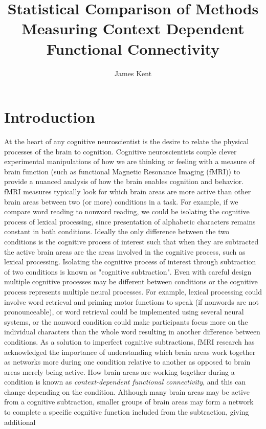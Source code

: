 \documentclass[phd,appendix,figures]{uithesis}
\title{Statistical Comparison of Methods Measuring Context Dependent Functional Connectivity}
\author{James Kent}
\begin{document}
\frontmatter
\chapter{Introduction}

At the heart of any cognitive neuroscientist is the desire to relate the physical
processes of the brain to cognition.
Cognitive neuroscientists couple clever experimental manipulations
of how we are thinking or feeling with a measure of brain function
(such as functional Magnetic Resonance Imaging (fMRI)) to provide a nuanced
analysis of how the brain enables cognition and behavior.
fMRI measures typically look for which brain areas are more
active than other brain areas between two (or more) conditions in a task.
For example, if we compare word reading to nonword reading, we could be isolating
the cognitive process of lexical processing, since presentation of alphabetic characters
remains constant in both conditions.
Ideally the only difference between the two conditions is the cognitive process
of interest such that when they are subtracted the active brain areas are
the areas involved in the cognitive process, such as lexical processing.
Isolating the cognitive process of interest through subtraction of two conditions
is known as "cognitive subtraction".
Even with careful design multiple cognitive processes may be
different between conditions or the cognitive process represents multiple
neural processes.
For example, lexical processing could involve word retrieval and priming motor functions
to speak (if nonwords are not pronounceable), or word retrieval could be implemented
using several neural systems, or the nonword condition could make participants focus more
on the individual characters than the whole word resulting in another difference between conditions.
As a solution to imperfect cognitive subtractions, fMRI research has acknowledged the importance of understanding
which brain areas work together as networks more during one condition relative to another as opposed to
brain areas merely being active.
How brain areas are working together during a condition is known as \textit{context-dependent functional connectivity},
and this can change depending on the condition.
Although many brain areas may be active from a cognitive subtraction,
smaller groups of brain areas may form a network to complete a specific
cognitive function included from the subtraction, giving additional
\end{document}
